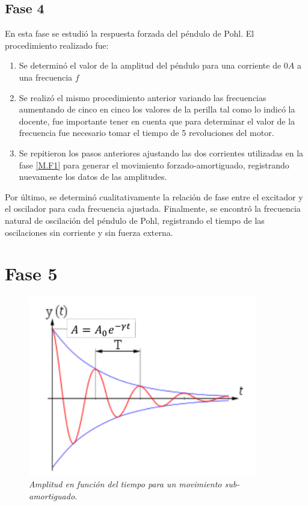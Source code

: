 \documentclass[spanish,notitlepage,letterpaper, 12pt]{article}
\begin{document}
\subsection{Fase 4}
En esta fase se estudió la respuesta forzada del péndulo de Pohl. El procedimiento realizado fue:
\begin{enumerate}
    \item Se determinó el valor de la amplitud del
péndulo para una corriente de $0A$ a una frecuencia $f$ 
    \item Se realizó el mismo procedimiento anterior variando las frecuencias aumentando de cinco en cinco los valores de la perilla tal como lo indicó la docente, fue importante tener en cuenta que para determinar el valor de la frecuencia fue necesario tomar el tiempo de 5 revoluciones del motor. 
    \item Se repitieron los pasos anteriores ajustando las dos corrientes utilizadas en la fase \ref{M.F1} para generar el movimiento forzado-amortiguado,
registrando nuevamente los datos de las amplitudes.
\end{enumerate}
Por último, se determinó cualitativamente la relación de fase entre el excitador y el
oscilador para cada frecuencia ajustada. Finalmente, se encontró la frecuencia natural
de oscilación del péndulo de Pohl, registrando el tiempo de las oscilaciones sin corriente y
sin fuerza externa.
\newpage
\section{Fase 5}
\begin{figure}[ht]
    \centering
    \includegraphics[width=10.0cm]{images/amplitud-vs-tiempo.png}
    \caption{\textit{Amplitud en función del tiempo para un movimiento sub-amortiguado.}}
    \label{fig:2}
\end{figure}
\end{document}
